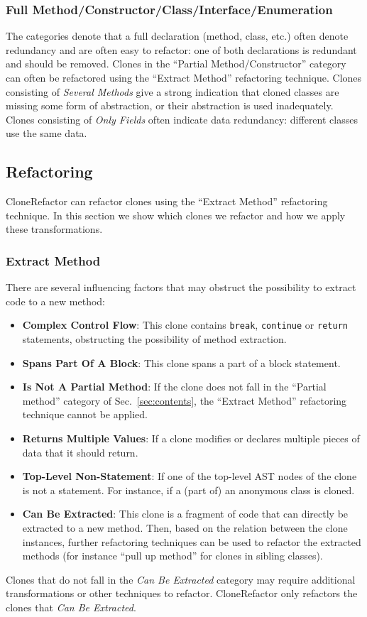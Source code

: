 \documentclass[sigconf,review, table]{acmart}
\begin{document}
\subsubsection{Full Method/Constructor/Class/Interface/Enumeration}
The categories denote that a full declaration (method, class, etc.) often denote redundancy and are often easy to refactor: one of both declarations is redundant and should be removed. Clones in the ``Partial Method/Constructor'' category can often be refactored using the ``Extract Method'' refactoring technique. Clones consisting of \textit{Several Methods} give a strong indication that cloned classes are missing some form of abstraction, or their abstraction is used inadequately. Clones consisting of \textit{Only Fields} often indicate data redundancy: different classes use the same data.

\subsection{Refactoring}
CloneRefactor can refactor clones using the ``Extract Method'' refactoring technique. In this section we show which clones we refactor and how we apply these transformations.

\subsubsection{Extract Method}
There are several influencing factors that may obstruct the possibility to extract code to a new method:
\begin{itemize}
    \item \textbf{Complex Control Flow}: This clone contains \texttt{break}, \texttt{continue} or \texttt{return} statements, obstructing the possibility of method extraction.
    \item \textbf{Spans Part Of A Block}: This clone spans a part of a block statement.
    \item \textbf{Is Not A Partial Method}: If the clone does not fall in the ``Partial method'' category of Sec.~\ref{sec:contents}, the ``Extract Method'' refactoring technique cannot be applied.
    \item \textbf{Returns Multiple Values}: If a clone modifies or declares multiple pieces of data that it should return.
    \item \textbf{Top-Level Non-Statement}: If one of the top-level AST nodes of the clone is not a statement. For instance, if a (part of) an anonymous class is cloned.
    \item \textbf{Can Be Extracted}: This clone is a fragment of code that can directly be extracted to a new method. Then, based on the relation between the clone instances, further refactoring techniques can be used to refactor the extracted methods (for instance ``pull up method'' for clones in sibling classes).
\end{itemize}
Clones that do not fall in the \textit{Can Be Extracted} category may require additional transformations or other techniques to refactor. CloneRefactor only refactors the clones that \textit{Can Be Extracted}.
\end{document}
